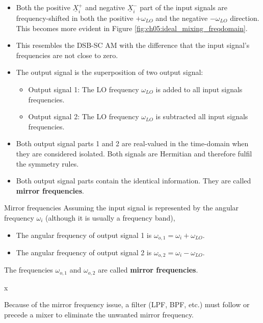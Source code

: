 \begin{refsection}
\begin{itemize}
	\item Both the positive $\underline{X}_{i}^{+}$ and negative $\underline{X}_{i}^{-}$ part of the input signals are frequency-shifted in both the positive $+ \omega_{LO}$ and the negative $- \omega_{LO}$ direction. This becomes more evident in Figure \ref{fig:ch05:ideal_mixing_freqdomain}.
	\item This resembles the \ac{DSB-SC} \ac{AM} with the difference that the input signal's frequencies are not close to zero.
	\item The output signal is the superposition of two output signal:
	\begin{itemize}
		\item Output signal 1: The \ac{LO} frequency $\omega_{LO}$ is added to all input signals frequencies.
		\item Output signal 2: The \ac{LO} frequency $\omega_{LO}$ is subtracted all input signals frequencies.
	\end{itemize}
	\item Both output signal parts 1 and 2 are real-valued in the time-domain when they are considered isolated. Both signals are Hermitian and therefore fulfil the symmetry rules.
	\item Both output signal parts contain the identical information. They are called  \textbf{mirror frequencies}.
\end{itemize}

\begin{definition}{Mirror frequencies}
	Assuming the input signal is represented by the angular frequency $\omega_i$ (although it is usually a frequency band),
	\begin{itemize}
		\item The angular frequency of output signal 1 is $\omega_{o,1} = \omega_{i} + \omega_{LO}$.
		\item The angular frequency of output signal 2 is $\omega_{o,2} = \omega_{i} - \omega_{LO}$.
	\end{itemize}

	\vspace{0.5em}

	The frequencies $\omega_{o,1}$ and $\omega_{o,2}$ are called  \textbf{mirror frequencies}.
\end{definition}

x

\begin{attention}
	Because of the mirror frequency issue, a filter (\ac{LPF}, \ac{BPF}, etc.) must follow or precede a mixer to eliminate the unwanted mirror frequency.
\end{attention}


\end{refsection}

